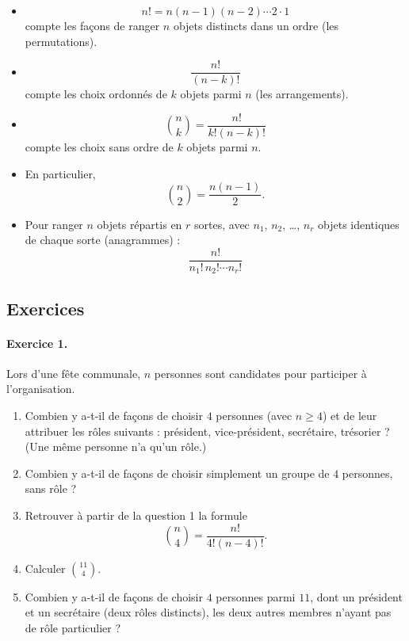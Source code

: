 \begin{itemize}
    \item
    \[
    \boxed{n!=n(n-1)(n-2)\cdots 2\cdot 1}
    \]
    compte les façons de ranger \(n\) objets distincts dans un ordre (les permutations).

    \item
    \[
    \boxed{\frac{n!}{(n-k)!}}
    \]
    compte les choix ordonnés de \(k\) objets parmi \(n\) (les arrangements).

    \item
    \[
    \boxed{\binom{n}{k}=\frac{n!}{k!(n-k)!}}
    \]
    compte les choix sans ordre de \(k\) objets parmi \(n\).

    \item En particulier,
    \[
    \boxed{\binom{n}{2}=\frac{n(n-1)}{2}.}
    \]

    \item Pour ranger \(n\) objets répartis en \(r\) sortes, avec \(n_1\), \(n_2\), \dots, \(n_r\)
    objets identiques de chaque sorte (anagrammes) :
    \[
    \boxed{\frac{n!}{n_1!\,n_2!\cdots n_r!}}
    \]
\end{itemize}

\subsection{Exercices}

\paragraph{Exercice 1.}
Lors d’une fête communale, \(n\) personnes sont candidates pour participer à l’organisation.

\begin{enumerate}
    \item Combien y a-t-il de façons de choisir \(4\) personnes (avec \(n\ge 4\)) et de leur attribuer les rôles suivants :
    président, vice-président, secrétaire, trésorier ? (Une même personne n’a qu’un rôle.)

    \item Combien y a-t-il de façons de choisir simplement un groupe de \(4\) personnes, sans rôle ?

    \item Retrouver à partir de la question 1 la formule
    \[
    \binom{n}{4}=\frac{n!}{4!(n-4)!}.
    \]

    \item Calculer \(\binom{11}{4}\).

    \item Combien y a-t-il de façons de choisir \(4\) personnes parmi \(11\), dont un président et un
    secrétaire (deux rôles distincts), les deux autres membres n’ayant pas de rôle particulier ?
\end{enumerate}

